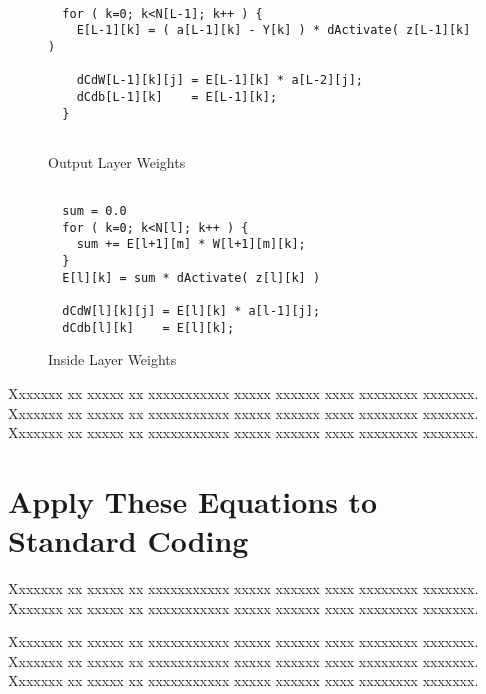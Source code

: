 \documentclass{article}
\begin{document}
\begin{figure}[h]
\caption{Output Layer Weights}
\begin{Verbatim}[frame=single]

  for ( k=0; k<N[L-1]; k++ ) {
    E[L-1][k] = ( a[L-1][k] - Y[k] ) * dActivate( z[L-1][k] )

    dCdW[L-1][k][j] = E[L-1][k] * a[L-2][j];
    dCdb[L-1][k]    = E[L-1][k];
  }
  
\end{Verbatim}
\end{figure}


\begin{figure}[h]
\caption{Inside Layer Weights}
\begin{Verbatim}[frame=single]

  sum = 0.0
  for ( k=0; k<N[l]; k++ ) {
    sum += E[l+1][m] * W[l+1][m][k];
  }
  E[l][k] = sum * dActivate( z[l][k] )

  dCdW[l][k][j] = E[l][k] * a[l-1][j];
  dCdb[l][k]    = E[l][k];

\end{Verbatim}
\end{figure}


Xxxxxxx xx xxxxx xx xxxxxxxxxxx xxxxx xxxxxx xxxx xxxxxxxx xxxxxxx.
Xxxxxxx xx xxxxx xx xxxxxxxxxxx xxxxx xxxxxx xxxx xxxxxxxx xxxxxxx.
Xxxxxxx xx xxxxx xx xxxxxxxxxxx xxxxx xxxxxx xxxx xxxxxxxx xxxxxxx.

\section{Apply These Equations to Standard Coding}

Xxxxxxx xx xxxxx xx xxxxxxxxxxx xxxxx xxxxxx xxxx xxxxxxxx xxxxxxx.
Xxxxxxx xx xxxxx xx xxxxxxxxxxx xxxxx xxxxxx xxxx xxxxxxxx xxxxxxx.

Xxxxxxx xx xxxxx xx xxxxxxxxxxx xxxxx xxxxxx xxxx xxxxxxxx xxxxxxx.
Xxxxxxx xx xxxxx xx xxxxxxxxxxx xxxxx xxxxxx xxxx xxxxxxxx xxxxxxx.
Xxxxxxx xx xxxxx xx xxxxxxxxxxx xxxxx xxxxxx xxxx xxxxxxxx xxxxxxx.
\end{document}
